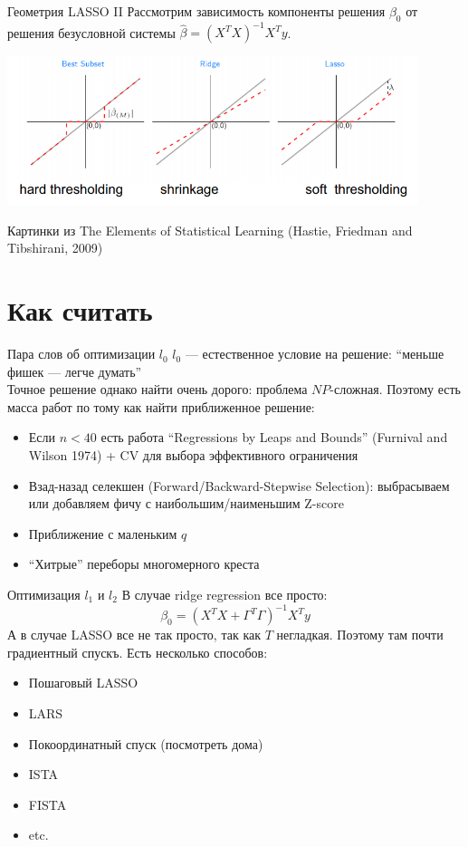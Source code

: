 \documentclass[14pt, fleqn, xcolor={dvipsnames, table}]{beamer}
\begin{document}
\begin{frame}{Геометрия LASSO II}
\small
Рассмотрим зависимость компоненты решения $\beta_0$ от решения безусловной системы $\hat{\beta} = \left(X^TX\right)^{-1}X^Ty$.
\begin{center}
\includegraphics[width=0.9\textwidth]{shrinkage.png} 
\end{center}
\footnotesize
Картинки из The Elements of Statistical Learning (Hastie, Friedman and Tibshirani, 2009)
\end{frame}

\section{Как считать}
\begin{frame}{Пара слов об оптимизации $l_0$}
\small
$l_0$ --- естественное условие на решение: ``меньше фишек --- легче думать'' \\
Точное решение однако найти очень дорого: проблема $NP$-сложная. Поэтому есть масса работ по тому как найти приближенное решение:
\begin{itemize}
  \item Если $n < 40$ есть работа ``Regressions by Leaps and Bounds'' (Furnival and Wilson 1974) + CV для выбора эффективного ограничения
  \item Взад-назад селекшен (Forward/Backward-Stepwise Selection): выбрасываем или добавляем фичу с наибольшим/наименьшим Z-score
  \item Приближение с маленьким $q$
  \item ``Хитрые'' переборы многомерного креста
\end{itemize}
\end{frame}

\begin{frame}{Оптимизация $l_1$ и $l_2$}
\small
В случае ridge regression все просто:
$$
\beta_0 = \left(X^{T}X+ \Gamma^{T} \Gamma\right)^{-1}X^{T}y
$$
А в случае LASSO все не так просто, так как $T$ негладкая. Поэтому там почти градиентный спускъ. Есть несколько способов:
\begin{itemize}
\small
  \item Пошаговый LASSO
  \item LARS
  \item Покоординатный спуск (посмотреть дома)
  \item ISTA
  \item FISTA
  \item etc.
\end{itemize}
\end{frame}
\end{document}
